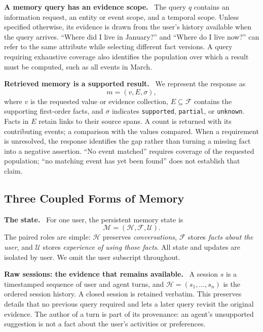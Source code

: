 \documentclass[10pt,twocolumn]{article}
\newcommand{\Hh}{\mathcal{H}}
\newcommand{\Ff}{\mathcal{F}}
\newcommand{\Uu}{\mathcal{U}}
\newcommand{\Mm}{\mathcal{M}}
\newcommand{\runin}[1]{\smallskip\noindent\textbf{#1.}\ }
\begin{document}
\runin{A memory query has an evidence scope}
The query $q$ contains an information request, an entity or event scope,
and a temporal scope. Unless specified otherwise, its evidence is drawn
from the user's history available when the query arrives. ``Where did
I live in January?'' and ``Where do I live now?'' can refer to the same
attribute while selecting different fact versions. A query requiring
exhaustive coverage also identifies the population over which a result
must be computed, such as all events in March.

\runin{Retrieved memory is a supported result}
We represent the response as
\begin{equation}
\label{eq:new-response}
m=(v,E,\sigma),
\end{equation}
where $v$ is the requested value or evidence collection, $E\subseteq\Ff$
contains the supporting first-order facts, and $\sigma$ indicates
\texttt{supported}, \texttt{partial}, or \texttt{unknown}. Facts in $E$
retain links to their source spans. A count is returned with its
contributing events; a comparison with the values compared. When a
requirement is unresolved, the response identifies the gap rather than
turning a missing fact into a negative assertion. ``No event matched''
requires coverage of the requested population; ``no matching event has
yet been found'' does not establish that claim.

\subsection{Three Coupled Forms of Memory}
\label{subsec:new-state}

\runin{The state}
For one user, the persistent memory state is
\begin{equation}
\label{eq:new-state}
\boxed{\Mm=(\Hh,\Ff,\Uu).}
\end{equation}
The paired roles are simple: $\Hh$ preserves \emph{conversations}, $\Ff$
stores \emph{facts about the user}, and $\Uu$ stores \emph{experience of
using those facts}. All state and updates are isolated by user. We omit
the user subscript throughout.

\runin{Raw sessions: the evidence that remains available}
A session $s$ is a timestamped sequence of user and agent turns, and
$\Hh=(s_1,\ldots,s_n)$ is the ordered session history. A closed session
is retained verbatim. This preserves details that no previous query
required and lets a later query revisit the original evidence. The
author of a turn is part of its provenance: an agent's unsupported
suggestion is not a fact about the user's activities or preferences.
\end{document}
